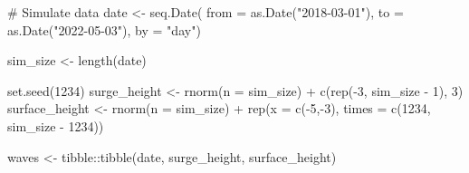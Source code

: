 \documentclass[
  letterpaper,
  DIV=11,
  numbers=noendperiod]{scrreprt}
\newenvironment{Shaded}{\begin{snugshade}}{\end{snugshade}}
\newcommand{\AttributeTok}[1]{\textcolor[rgb]{0.40,0.45,0.13}{#1}}
\newcommand{\CommentTok}[1]{\textcolor[rgb]{0.37,0.37,0.37}{#1}}
\newcommand{\DecValTok}[1]{\textcolor[rgb]{0.68,0.00,0.00}{#1}}
\newcommand{\FunctionTok}[1]{\textcolor[rgb]{0.28,0.35,0.67}{#1}}
\newcommand{\NormalTok}[1]{\textcolor[rgb]{0.00,0.23,0.31}{#1}}
\newcommand{\OtherTok}[1]{\textcolor[rgb]{0.00,0.23,0.31}{#1}}
\newcommand{\SpecialCharTok}[1]{\textcolor[rgb]{0.37,0.37,0.37}{#1}}
\newcommand{\StringTok}[1]{\textcolor[rgb]{0.13,0.47,0.30}{#1}}
\begin{document}
\begin{Shaded}
\begin{Highlighting}[]
\CommentTok{\# Simulate data}
\NormalTok{date }\OtherTok{\textless{}{-}} \FunctionTok{seq.Date}\NormalTok{(}
  \AttributeTok{from =} \FunctionTok{as.Date}\NormalTok{(}\StringTok{"2018{-}03{-}01"}\NormalTok{),}
  \AttributeTok{to =} \FunctionTok{as.Date}\NormalTok{(}\StringTok{"2022{-}05{-}03"}\NormalTok{),}
  \AttributeTok{by =} \StringTok{"day"}\NormalTok{)}

\NormalTok{sim\_size }\OtherTok{\textless{}{-}} \FunctionTok{length}\NormalTok{(date)}

\FunctionTok{set.seed}\NormalTok{(}\DecValTok{1234}\NormalTok{)}
\NormalTok{surge\_height }\OtherTok{\textless{}{-}} \FunctionTok{rnorm}\NormalTok{(}\AttributeTok{n =}\NormalTok{ sim\_size) }\SpecialCharTok{+} \FunctionTok{c}\NormalTok{(}\FunctionTok{rep}\NormalTok{(}\SpecialCharTok{{-}}\DecValTok{3}\NormalTok{, sim\_size }\SpecialCharTok{{-}} \DecValTok{1}\NormalTok{), }\DecValTok{3}\NormalTok{)}
\NormalTok{surface\_height }\OtherTok{\textless{}{-}} \FunctionTok{rnorm}\NormalTok{(}\AttributeTok{n =}\NormalTok{ sim\_size) }\SpecialCharTok{+} \FunctionTok{rep}\NormalTok{(}\AttributeTok{x =} \FunctionTok{c}\NormalTok{(}\SpecialCharTok{{-}}\DecValTok{5}\NormalTok{,}\SpecialCharTok{{-}}\DecValTok{3}\NormalTok{), }\AttributeTok{times =} \FunctionTok{c}\NormalTok{(}\DecValTok{1234}\NormalTok{, sim\_size }\SpecialCharTok{{-}} \DecValTok{1234}\NormalTok{))}

\NormalTok{waves }\OtherTok{\textless{}{-}}\NormalTok{ tibble}\SpecialCharTok{::}\FunctionTok{tibble}\NormalTok{(date, surge\_height, surface\_height)}


\end{Highlighting}
\end{Shaded}
\end{document}
